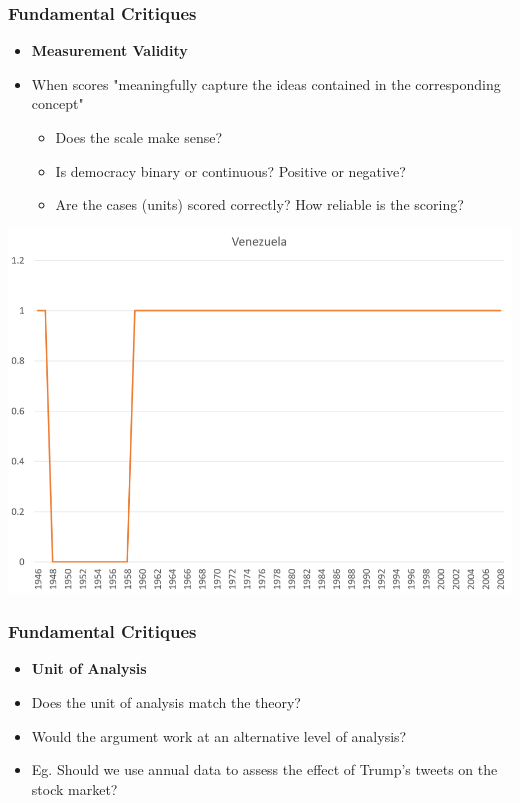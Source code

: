 \documentclass[xcolor=x11names,compress]{beamer}\usepackage[]{graphicx}\usepackage[]{xcolor}
\renewcommand{\(}{\begin{columns}}
\renewcommand{\)}{\end{columns}}
\newcommand{\<}[1]{\begin{column}{#1}}
\renewcommand{\>}{\end{column}}
\begin{document}
\begin{frame}
\frametitle{Fundamental Critiques}
\begin{itemize}
\item \textbf{Measurement Validity}
\pause
\item When scores "meaningfully capture the ideas contained in the corresponding concept"
\pause
\begin{itemize}
\item Does the scale make sense? 
\pause
\item Is democracy binary or continuous? Positive or negative?
\pause
\item Are the cases (units) scored correctly? How reliable is the scoring?
\end{itemize}
\end{itemize}
\end{frame}



\includegraphics[width=\textwidth]{Venezuala_binary.png}


\begin{frame}
\frametitle{Fundamental Critiques}
\begin{itemize}
\item \textbf{Unit of Analysis}
\pause
\item Does the unit of analysis match the theory?
\pause
\item Would the argument work at an alternative level of analysis?
\pause
\item Eg. Should we use annual data to assess the effect of Trump's tweets on the stock market?
\end{itemize}
\end{frame}
\end{document}
